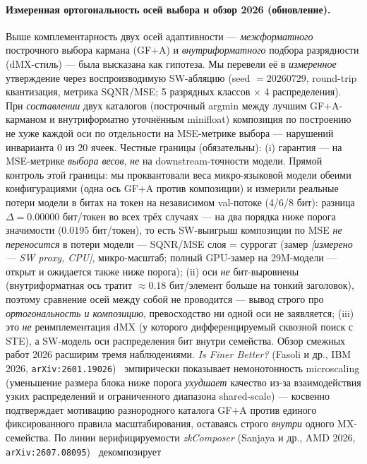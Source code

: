 \documentclass[11pt,a4paper]{article}
\theoremstyle{plain}
\begin{document}
\paragraph{Измеренная ортогональность осей выбора и обзор 2026 (обновление).}
Выше комплементарность двух осей адаптивности --- \emph{межформатного}
построчного выбора кармана (GF+A) и \emph{внутриформатного} подбора
разрядности (dMX-стиль) --- была высказана как гипотеза. Мы перевели её в
\emph{измеренное} утверждение через воспроизводимую SW-абляцию
(seed \(=20260729\), round-trip квантизация, метрика SQNR/MSE; 5 разрядных
классов \(\times\) 4 распределения). При \emph{составлении} двух каталогов
(построчный argmin между лучшим GF+A-карманом и внутриформатно уточнённым
minifloat) композиция по построению не хуже каждой оси по отдельности на
MSE-метрике выбора --- нарушений инварианта \(0\) из \(20\) ячеек. Честные
границы (обязательны): (i) гарантия --- на MSE-метрике \emph{выбора весов},
\emph{не} на downstream-точности модели. Прямой контроль
этой границы: мы проквантовали веса микро-языковой модели обеими
конфигурациями (одна ось GF+A против композиции) и измерили реальные
потери модели в битах на токен на независимом val-потоке (4/6/8 бит):
разница \(\Delta = 0.00000\) бит/токен во всех трёх случаях ---
на два порядка ниже порога значимости (\(0.0195\) бит/токен),
то есть SW-выигрыш композиции по MSE \emph{не переносится} в потери
модели --- SQNR/MSE слоя = суррогат (замер \emph{[измерено --- SW
proxy, CPU]}, микро-масштаб; полный GPU-замер на 29M-модели ---
открыт и ожидается также ниже порога); (ii) оси \emph{не} бит-выровнены (внутриформатная ось тратит
\(\approx\!0.18\) бит/элемент больше на тонкий заголовок), поэтому
сравнение осей между собой не проводится --- вывод строго про
\emph{ортогональность и композицию}, превосходство ни одной оси не
заявляется; (iii) это \emph{не} реимплементация dMX (у которого
дифференцируемый сквозной поиск с STE), а SW-модель оси распределения бит
внутри семейства. Обзор смежных работ 2026 расширим тремя наблюдениями.
\emph{Is Finer Better?} (Fasoli и др., IBM 2026,
\texttt{arXiv:2601.19026})~\cite{isfiner2026} эмпирически показывает
немонотонность microscaling (уменьшение размера блока ниже порога
\emph{ухудшает} качество из-за взаимодействия узких распределений и
ограниченного диапазона shared-scale) --- косвенно подтверждает мотивацию
разнородного каталога GF+A против единого фиксированного правила
масштабирования, оставаясь строго \emph{внутри} одного MX-семейства.
По линии верифицируемости \emph{zkComposer} (Sanjaya и др., AMD 2026,
\texttt{arXiv:2607.08095})~\cite{zkcomposer2026} декомпозирует
\end{document}
